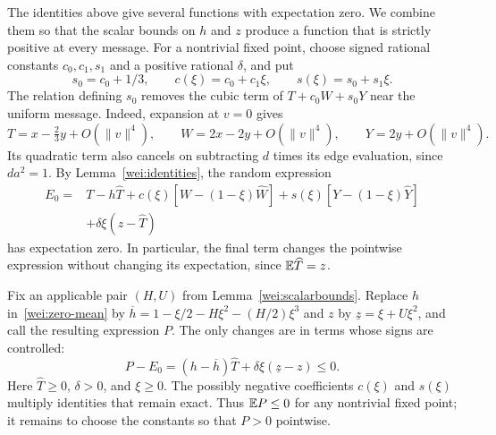 The identities above give several functions with expectation zero.  We
combine them so that the scalar bounds on $h$ and $z$ produce a function
that is strictly positive at every message.  For a nontrivial fixed
point, choose signed rational constants $c_0,c_1,s_1$ and a positive
rational $\delta$, and put
\[
 s_0=c_0+1/3,\qquad c(\xi)=c_0+c_1\xi,\qquad
 s(\xi)=s_0+s_1\xi.
\]
The relation defining $s_0$ removes the cubic term of
$T+c_0W+s_0Y$ near the uniform message.  Indeed, expansion at $v=0$
gives
\[
 T=x-\tfrac23y+O(\|v\|^4),\qquad
 W=2x-2y+O(\|v\|^4),\qquad Y=2y+O(\|v\|^4).
\]
Its quadratic term also cancels on subtracting $d$ times its edge
evaluation, since $da^2=1$.
By Lemma~\ref{wei:identities}, the random expression
\begin{align}
 E_0={}&T-h\widehat T
       +c(\xi)[W-(1-\xi)\widehat W]
       +s(\xi)[Y-(1-\xi)\widehat Y]\nonumber\\
     &+\delta\xi(z-\widehat T)
 \label{wei:zero-mean}
\end{align}
has expectation zero.  In particular, the final term changes the
pointwise expression without changing its expectation, since
$\mathbb E\widehat T=z$.

Fix an applicable pair $(H,U)$ from Lemma~\ref{wei:scalarbounds}.
Replace $h$ in~\eqref{wei:zero-mean} by
$\overline h=1-\xi/2-H\xi^2-(H/2)\xi^3$ and $z$ by
$\underline z=\xi+U\xi^2$, and call the resulting expression $P$.
The only changes are in terms whose signs are controlled:
\begin{equation}\label{wei:comparison}
 P-E_0=(h-\overline h)\widehat T
          +\delta\xi(\underline z-z)\le0.
\end{equation}
Here $\widehat T\ge0$, $\delta>0$, and $\xi\ge0$.
The possibly negative coefficients $c(\xi)$ and $s(\xi)$ multiply
identities that remain exact.  Thus $\mathbb E P\le0$ for any nontrivial
fixed point; it remains to choose the constants so that $P>0$
pointwise.


